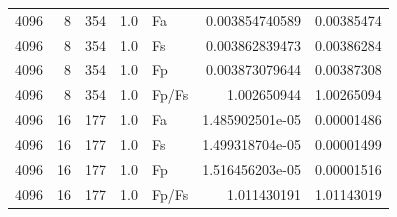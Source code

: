 \begin{longtable}{rrrllrr}
4096 & 8 & 354 & 1.0 & Fa & 0.003854740589 & 0.00385474 \\
4096 & 8 & 354 & 1.0 & Fs & 0.003862839473 & 0.00386284 \\
4096 & 8 & 354 & 1.0 & Fp & 0.003873079644 & 0.00387308 \\
4096 & 8 & 354 & 1.0 & Fp/Fs & 1.002650944 & 1.00265094 \\
4096 & 16 & 177 & 1.0 & Fa & 1.485902501e-05 & 0.00001486 \\
4096 & 16 & 177 & 1.0 & Fs & 1.499318704e-05 & 0.00001499 \\
4096 & 16 & 177 & 1.0 & Fp & 1.516456203e-05 & 0.00001516 \\
4096 & 16 & 177 & 1.0 & Fp/Fs & 1.011430191 & 1.01143019 \\
\end{longtable}

